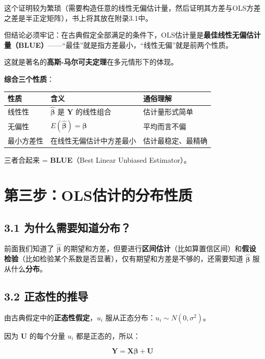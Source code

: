 \documentclass[12pt,a4paper]{ctexart}
\begin{document}
这个证明较为繁琐（需要构造任意的线性无偏估计量，然后证明其方差与OLS方差之差是半正定矩阵），书上将其放在附录3.1中。

但结论必须牢记：在古典假定全部满足的条件下，OLS估计量是\textbf{最佳线性无偏估计量（BLUE）}——“最佳”就是指方差最小，“线性无偏”就是前两个性质。

这就是著名的\textbf{高斯-马尔可夫定理}在多元情形下的体现。

\textbf{综合三个性质}：

\begin{center}
\begin{tabular}{lll}
\toprule
\textbf{性质} & \textbf{含义} & \textbf{通俗理解} \\
\midrule
线性性 & $\hat{\boldsymbol{\beta}}$ 是 $\mathbf{Y}$ 的线性组合 & 估计量形式简单 \\
无偏性 & $E(\hat{\boldsymbol{\beta}}) = \boldsymbol{\beta}$ & 平均而言不偏 \\
最小方差性 & 在线性无偏估计中方差最小 & 估计最稳定、最精确 \\
\bottomrule
\end{tabular}
\end{center}

三者合起来 = \textbf{BLUE}（Best Linear Unbiased Estimator）。

\section{第三步：OLS估计的分布性质}

\subsection{3.1 为什么需要知道分布？}

前面我们知道了 $\hat{\boldsymbol{\beta}}$ 的期望和方差，但要进行\textbf{区间估计}（比如算置信区间）和\textbf{假设检验}（比如检验某个系数是否显著），仅有期望和方差是不够的，还需要知道 $\hat{\boldsymbol{\beta}}$ 服从什么\textbf{分布}。

\subsection{3.2 正态性的推导}

由古典假定中的\textbf{正态性假定}，$u_i$ 服从正态分布：$u_i \sim N(0, \sigma^2)$。

因为 $\mathbf{U}$ 的每个分量 $u_i$ 都是正态的，所以：

\[
\mathbf{Y} = \mathbf{X}\boldsymbol{\beta} + \mathbf{U}
\]
\end{document}
